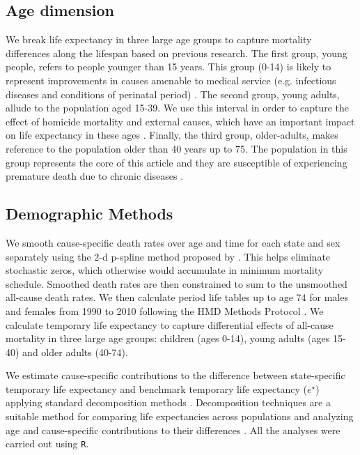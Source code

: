 \documentclass[11.5pt]{article}
\begin{document}
\begin{spacing}{1.5}
\subsection*{Age dimension}

We break life expectancy in three large age groups to capture mortality differences along the lifespan based on previous research. The first group, young people, refers to people younger than 15 years. This group (0-14) is likely to represent improvements in causes amenable to medical service (e.g. infectious diseases and conditions of perinatal period) \citep{canudas2014}. The second group, young adults, allude to the population aged 15-39. We use this interval in order to capture the effect of homicide mortality and external causes, which have an important impact on life expectancy in these ages \citep{Aburto2015}. Finally, the third group, older-adults, makes reference to the population older than 40 years up to 75. The population in this group represents the core of this article and they are susceptible of experiencing premature death due to chronic diseases \citep{canudas2014}.


\subsection*{Demographic Methods}
We smooth cause-specific death rates over age and time for each
state and sex separately using the 2-d p-spline method proposed by
\citet{GC2012}.
This helps eliminate stochastic zeros, which otherwise would accumulate in minimum mortality
schedule. Smoothed death rates are
then constrained to sum to the unsmoothed all-cause death rates. We then calculate period life tables up to
age 74 for males and females from 1990 to 2010 following the HMD Methods
Protocol \citep{HMDMP}. We calculate temporary life expectancy to
capture differential effects of all-cause mortality in three large age
groups: children (ages 0-14), young adults (ages 15-40) and older adults
(40-74).

We estimate cause-specific contributions to the difference between
state-specific temporary life expectancy and benchmark temporary life expectancy
($e^{\star}$) applying standard decomposition methods
\citep{horiuchi2008}. Decomposition techniques are a suitable method for comparing life expectancies across populations and analyzing age and cause-specific contributions to their differences \citep{preston2001}. All the analyses were carried out
using \texttt{R}.


\end{spacing}
\end{document}
